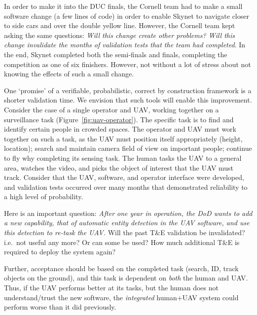 In order to make it into the DUC finals, the Cornell team had to make a small software change (a few lines of code) in order to enable Skynet to navigate closer to side cars and over the double yellow line. However, the Cornell team kept asking the same questions: {\it Will this change create other problems? Will this change invalidate the months of validation tests that the team had completed}. In the end, Skynet completed both the semi-finals and finals, completing the competition as one of six finishers. However, not without a lot of stress about not knowing the effects of such a small change. 

One `promise' of a verifiable, probabilistic, correct by construction framework is a shorter validation time. We envision that such tools will enable this improvement. Consider the case of a single operator and UAV, working together on a surveillance task (Figure~\ref{fig:uav-operator}). The specific task is to find and identify certain people in crowded spaces. The operator and UAV must work together on such a task, as the UAV must position itself appropriately (height, location); search and maintain camera field of view on important people; continue to fly why completing its sensing task. The human tasks the UAV to a general area, watches the video, and picks the object of interest that the UAV must track. Consider that the UAV, software, and operator interface were developed, and validation tests occurred over many months that demonstrated reliability to a high level of probability. 

Here is an important question: {\it After one year in operation, the DoD wants to add a new capability, that of automatic entity detection in the UAV software, and use this detection to re-task the UAV.}  Will the past T\&E validation be invalidated? i.e.\ not useful any more? Or can some be used? How much additional T\&E is required to deploy the system again? 

Further, acceptance should be based on the completed task (search, ID, track objects on the ground), and this task is dependent on {\it both} the human and UAV. Thus, if the UAV performs better at its tasks, but the human does not understand/trust the new software, the {\it integrated} human+UAV system could perform worse than it did previously. 


